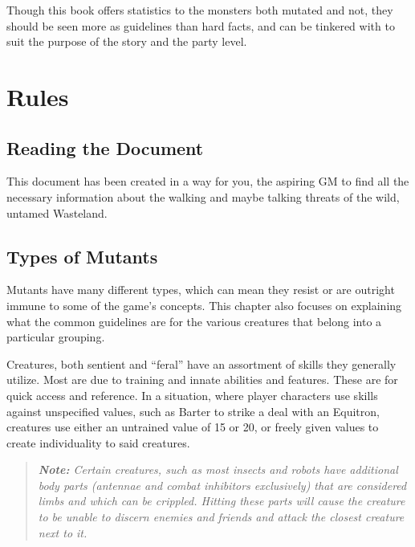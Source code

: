\documentclass[11pt,a4paper,twocolumn]{book}
\begin{document}
	Though this book offers statistics to the monsters both mutated and not, they should be seen more as guidelines than hard facts, and can be tinkered with to suit the purpose of the story and the party level.
	
	\clearpage
	
	\chapter{Rules}
	
	\section*{Reading the Document}
	This document has been created in a way for you, the aspiring GM to find all the necessary information about the walking and maybe talking threats of the wild, untamed Wasteland.
	
	\section*{Types of Mutants}
	Mutants have many different types, which can mean they resist or are outright immune to some of the game's concepts. This chapter also focuses on explaining what the common guidelines are for the various creatures that belong into a particular grouping.
	
	Creatures, both sentient and ``feral'' have an assortment of skills they generally utilize. Most are due to training and innate abilities and features. These are for quick access and reference. In a situation, where player characters use skills against unspecified values, such as Barter to strike a deal with an Equitron, creatures use either an untrained value of 15 or 20, or freely given values to create individuality to said creatures.
	
	\begin{verse}
		\emph{\textbf{Note:} Certain creatures, such as most insects and robots have additional body parts (antennae and combat inhibitors exclusively) that are considered limbs and which can be crippled. Hitting these parts will cause the creature to be unable to discern enemies and friends and attack the closest creature next to it.}
	\end{verse}
	
\end{document}
